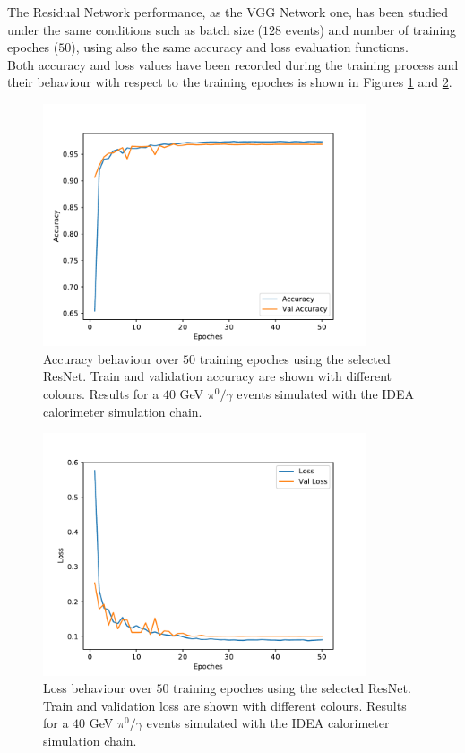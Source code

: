 The Residual Network performance, as the VGG Network one, has been studied under the same conditions such as batch size ($128$ events) and number of training epoches ($50$), using also the same accuracy and loss evaluation functions.\\
Both accuracy and loss values have been recorded during the training process and their behaviour with respect to the training epoches is shown in Figures \ref{fig:ResNet-acc} and \ref{fig:ResNet-loss}.

\begin{figure}
	\centering
	\includegraphics[width=0.85\textwidth]{IMG/Cap6/ResNet-D_Accuracy.pdf}
	\caption{Accuracy behaviour over $50$ training epoches using the selected ResNet. Train and validation accuracy are shown with different colours. Results for a $40$ GeV $\pi^0/\gamma$ events simulated with the IDEA calorimeter simulation chain.}
	\label{fig:ResNet-acc}
\end{figure}

\begin{figure}
	\centering
	\includegraphics[width=0.85\textwidth]{IMG/Cap6/ResNet-D_Loss.pdf}
	\caption{Loss behaviour over $50$ training epoches using the selected ResNet. Train and validation loss are shown with different colours.  Results for a $40$ GeV $\pi^0/\gamma$ events simulated with the IDEA calorimeter simulation chain.}
	\label{fig:ResNet-loss}
\end{figure}

